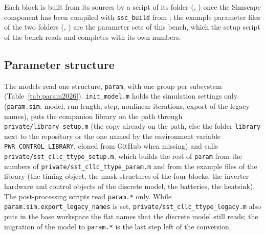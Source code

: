 \documentclass[12pt,a4paper]{scrartcl}
\begin{document}
\begin{onehalfspace}
\noindent Each block is built from its sources by a script of its folder (, ) once the Simscape component has been compiled with \texttt{ssc\_build} from ; the example parameter files of the two folders (, ) are the parameter sets of this bench, which the setup script of the bench reads and completes with its own numbers.

\subsection{Parameter structure}
\label{sec:bench2026_param}
The models read one structure, \texttt{param}, with one group per subsystem (Table~\ref{tab:param2026}). \texttt{init\_model.m} holds the simulation settings only (\texttt{param.sim}: model, run length, step, nonlinear iterations, export of the legacy names), puts the companion library on the path through \texttt{private/library\_setup.m} (the copy already on the path, else the folder \texttt{library} next to the repository or the one named by the environment variable \texttt{PWR\_CONTROL\_LIBRARY}, cloned from GitHub when missing) and calls \texttt{private/sst\_cllc\_ttype\_setup.m}, which builds the rest of \texttt{param} from the numbers of \texttt{private/sst\_cllc\_ttype\_param.m} and from the example files of the library (the timing object, the mask structures of the four blocks, the inverter hardware and control objects of the discrete model, the batteries, the heatsink). The post-processing scripts read \texttt{param.*} only. While \texttt{param.sim.export\_legacy\_names} is set, \texttt{private/sst\_cllc\_ttype\_legacy.m} also puts in the base workspace the flat names that the discrete model still reads; the migration of the model to \texttt{param.*} is the last step left of the conversion.


\end{onehalfspace}
\end{document}
